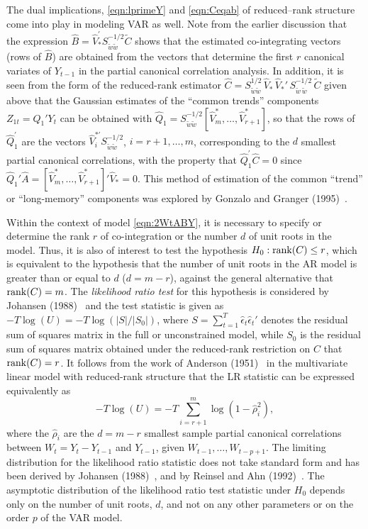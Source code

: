 The dual implications, \eqref{eqn:lprimeY} and \eqref{eqn:Ceqab} of reduced--rank structure come into play in modeling VAR as well. Note from the earlier discussion that the expression $\hat{B} = \hat{V}_*^{\prime} S_{\tilde{w}\tilde{w}}^{-1/2} \tilde{C}$ shows that the estimated co-integrating vectors (rows of $\hat{B}$) are obtained from the vectors that determine the first $r$ canonical variates of $Y_{t-1}$ in the partial canonical correlation analysis. In addition, it is seen from the form of the reduced-rank estimator $\hat{C} = S_{\tilde{w}\tilde{w}}^{1/2} \,\hat{V}_* \,\hat{V}_*' \,S_{\tilde{w} \,\tilde{w}}^{-1/2} \,\tilde{C}$ given above that the Gaussian estimates of the ``common trends'' components $Z_{1t} = Q_1' Y_t$ can be obtained with $\hat{Q}_1 = S_{\tilde{w}\tilde{w}}^{-1/2} [\hat{V}_m^* ,\ldots, \hat{V}_{r+1}^* ]$, so that the rows of $\hat{Q}_1^{\prime}$ are the vectors $\hat{V}_i^{* \prime} S_{\tilde{w}\tilde{w}}^{-1/2}$, $i = r + 1, \ldots, m$, corresponding to the $d$ smallest partial canonical correlations, with the property that $\hat{Q}_1^{\prime} \hat{C} = 0$ since $\hat{Q}_1' \hat{A} = [\hat{V}_m^* ,\ldots, \hat{V}_{r+1}^* ]' \hat{V}_* = 0$. This method of estimation of the common ``trend'' or ``long-memory'' components was explored by Gonzalo and Granger (1995)~\cite{gongra}.


Within the context of model \eqref{eqn:2WtABY}, it is necessary to specify or determine the rank $r$ of co-integration or the number $d$ of unit roots in the model. Thus, it is also of interest to test the hypothesis $H_0: \operatorname{rank}(C) \leq r$, which is equivalent to the hypothesis that the number of unit roots in the AR model is greater than or equal to $d$ ($d = m - r$), against the general alternative that $\operatorname{rank}(C) = m$.  The \emph{likelihood ratio test} for this hypothesis is considered by Johansen (1988)~\cite{johansen1988statistical} and the test statistic is given as $- T \log (U) = - T \log ( \lvert S \rvert / \lvert S_0 \rvert )$, where $S = \sum_{t=1}^T \hat{\epsilon}_t \hat{\epsilon}_t' $ denotes the residual sum of squares matrix in the full or unconstrained model, while $S_0 $ is the residual sum of squares matrix obtained under the reduced-rank restriction on $C$ that $\operatorname{rank}(C) = r $.  It follows from the work of Anderson (1951)~\cite{andersontw} in the multivariate linear model with reduced-rank structure that the LR statistic can be expressed equivalently as
	\begin{equation} \label{eqn:2negT}
	- T \log (U) = - T \sum_{i=r+1}^m \log ( 1 - \hat{\rho}_i^2 ),
	\end{equation}
where the $\hat{\rho}_i$ are the $d = m - r$ smallest sample partial canonical correlations between $W_t = Y_t - Y_{t-1}$ and $Y_{t-1}$, given $W_{t-1} ,\ldots, W_{t-p+1}$. The limiting distribution for the likelihood ratio statistic does not take standard form and has been derived by Johansen (1988)~\cite{johansen1988statistical}, and by Reinsel and Ahn (1992)~\cite{reinsel1992vector}. The asymptotic distribution of the likelihood ratio test statistic under $H_0$ depends only on the number of unit roots, $d$, and not on any other parameters or on the order $p$ of the VAR model.


